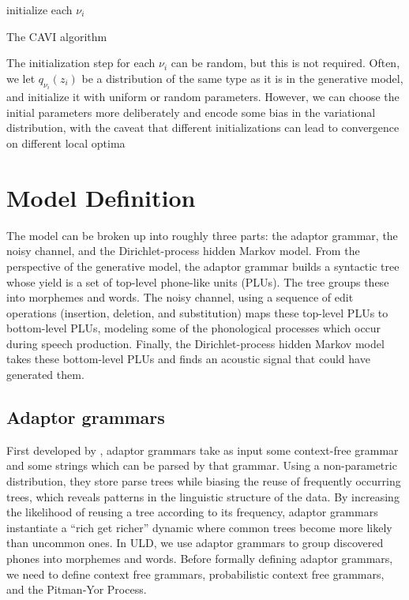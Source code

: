 \documentclass[12pt,letterpaper]{article}
\begin{document}
\begin{algorithm}[H]
initialize each $\nu_i$ \\
\caption{The CAVI algorithm}

\end{algorithm}

\noindent The initialization step for each $\nu_i$ can be random, but this is not required. Often, we let $q_{\nu_i}(z_i)$ be a distribution of the same type as it is in the generative model, and initialize it with uniform or random parameters. However, we can choose the initial parameters more deliberately and encode some bias in the variational distribution, with the caveat that different initializations can lead to convergence on different local optima \citep{blei:2017}



\section{Model Definition}
The model can be broken up into roughly three parts: the adaptor grammar, the noisy channel, and the Dirichlet-process hidden Markov model. From the perspective of the generative model, the adaptor grammar builds a syntactic tree whose yield is a set of top-level phone-like units (PLUs). The tree groups these into morphemes and words. The noisy channel, using a sequence of edit operations (insertion, deletion, and substitution) maps these top-level PLUs to bottom-level PLUs, modeling some of the phonological processes which occur during speech production. Finally, the Dirichlet-process hidden Markov model takes these bottom-level PLUs and finds an acoustic signal that could have generated them. 

\subsection{Adaptor grammars}
First developed by \citet{johnson:2007}, adaptor grammars take as input some context-free grammar and some strings which can be parsed by that grammar. Using a non-parametric distribution, they store parse trees while biasing the reuse of frequently occurring trees, which reveals patterns in the linguistic structure of the data. By increasing the likelihood of reusing a tree according to its frequency, adaptor grammars instantiate a ``rich get richer'' dynamic where common trees become more likely than uncommon ones. In ULD, we use adaptor grammars to group discovered phones into morphemes and words. Before formally defining adaptor grammars, we need to define context free grammars, probabilistic context free grammars, and the Pitman-Yor Process.
\end{document}
